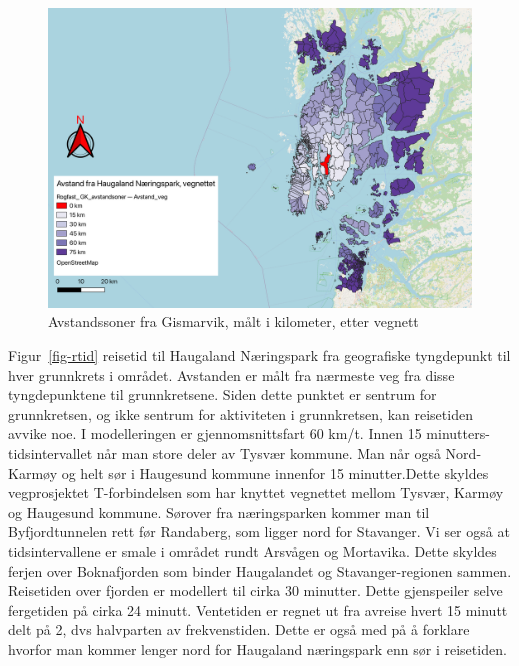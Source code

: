 \documentclass[
]{article}
\begin{document}
\begin{figure}[H]

{\centering \includegraphics{bilder/Avstand_veg.png}

}

\caption{\label{fig-avst-veg}Avstandssoner fra Gismarvik, målt i
kilometer, etter vegnett}

\end{figure}

Figur~\ref{fig-rtid} reisetid til Haugaland Næringspark fra geografiske
tyngdepunkt til hver grunnkrets i området. Avstanden er målt fra
nærmeste veg fra disse tyngdepunktene til grunnkretsene. Siden dette
punktet er sentrum for grunnkretsen, og ikke sentrum for aktiviteten i
grunnkretsen, kan reisetiden avvike noe. I modelleringen er
gjennomsnittsfart 60 km/t. Innen 15 minutters-tidsintervallet når man
store deler av Tysvær kommune. Man når også Nord-Karmøy og helt sør i
Haugesund kommune innenfor 15 minutter.Dette skyldes vegprosjektet
T-forbindelsen som har knyttet vegnettet mellom Tysvær, Karmøy og
Haugesund kommune. Sørover fra næringsparken kommer man til
Byfjordtunnelen rett før Randaberg, som ligger nord for Stavanger. Vi
ser også at tidsintervallene er smale i området rundt Arsvågen og
Mortavika. Dette skyldes ferjen over Boknafjorden som binder Haugalandet
og Stavanger-regionen sammen. Reisetiden over fjorden er modellert til
cirka 30 minutter. Dette gjenspeiler selve fergetiden på cirka 24
minutt. Ventetiden er regnet ut fra avreise hvert 15 minutt delt på 2,
dvs halvparten av frekvenstiden. Dette er også med på å forklare hvorfor
man kommer lenger nord for Haugaland næringspark enn sør i reisetiden.
\end{document}
